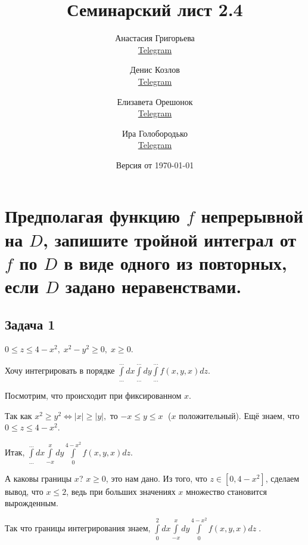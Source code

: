 \documentclass[a4paper, fleqn]{article}
\title{Семинарский лист 2.4}
\author{
     Анастасия Григорьева \\ \href{https://t.me/weifoll}{Telegram} \and
    Денис Козлов         \\ \href{https://t.me/DKozl50}{Telegram} \and
    Елизавета Орешонок   \\ \href{https://t.me/eaoresh}{Telegram} \and
    Ира Голобородько     \\ \href{https://t.me/Ira4kgl}{Telegram}
}
\date{Версия от {\ddmmyyyydate\today} \currenttime}
\begin{document}
    \maketitle
   
    \section*{Предполагая функцию $f$ непрерывной на $D$, запишите тройной интеграл от $f$ по $D$ в виде
    одного из повторных, если $D$ задано неравенствами.}
    
    \subsection*{Задача 1} 
    
    $0 \leq z \leq 4 - x^2, \; x^2 - y^2 \geq 0, \; x \geq 0. $
    
    Хочу интегрировать в порядке $\displaystyle \int \limits_{\dots}^{\dots} dx \int \limits_{\dots}^{\dots} dy \int \limits_{\dots}^{\dots} f(x, y, x) dz.$
    
    Посмотрим, что происходит при фиксированном $x$.
    
    Так как $x^2 \geq y^2 \iff |x| \geq |y|,$ то $-x \leq y \leq x \;  $ ($x$ положительный). Ещё знаем, что $0 \leq z \leq 4 -x^2.$
    
    Итак,  $\displaystyle \int \limits_{\dots}^{\dots} dx \int \limits_{-x}^{x} dy \int \limits_{0}^{4 -x^2} f(x, y, x) dz.$ 
    
    А каковы границы $x$? $x \geq 0$, это нам дано. Из того, что $z \in [0, 4 -x^2]$, сделаем вывод, что $x \leq 2$, ведь при больших значениях $x$ множество становится вырожденным.
    
    Так что границы интегрирования знаем,  $\boxed{\displaystyle \int \limits_{0}^{2} dx \int \limits_{-x}^{x} dy \int \limits_{0}^{4 -x^2} f(x, y, x) dz} \; .$ 
    
    
\end{document}
